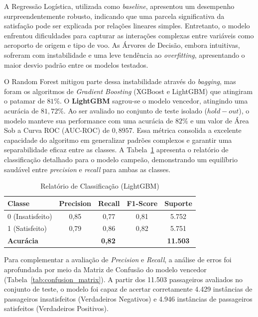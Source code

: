 \documentclass[12pt]{article}
\begin{document}
A Regressão Logística, utilizada como \textit{baseline}, apresentou um desempenho surpreendentemente robusto, indicando que uma parcela significativa da satisfação pode ser explicada por relações lineares simples. Entretanto, o modelo enfrentou dificuldades para capturar as interações complexas entre variáveis como aeroporto de origem e tipo de voo. As Árvores de Decisão, embora intuitivas, sofreram com instabilidade e uma leve tendência ao \textit{overfitting}, apresentando o maior desvio padrão entre os modelos testados.

O Random Forest mitigou parte dessa instabilidade através do \textit{bagging}, mas foram os algoritmos de \textit{Gradient Boosting} (XGBoost e LightGBM) que atingiram o patamar de $81\%$. O \textbf{LightGBM} sagrou-se o modelo vencedor, atingindo uma acurácia de $81,72\%$. Ao ser avaliado no conjunto de teste isolado ($hold-out$), o modelo manteve sua performance com uma acurácia de $82\%$ e um valor de Área Sob a Curva ROC (AUC-ROC) de $0,8957$. Essa métrica consolida a excelente capacidade do algoritmo em generalizar padrões complexos e garantir uma separabilidade eficaz entre as classes. A Tabela~\ref{tab:classification_report} apresenta o relatório de classificação detalhado para o modelo campeão, demonstrando um equilíbrio saudável entre \textit{precision} e \textit{recall} para ambas as classes.

\begin{table}[ht]
\centering
\caption{Relatório de Classificação (LightGBM)}
\label{tab:classification_report}
\begin{tabular}{|l|c|c|c|c|}
\hline
\textbf{Classe} & \textbf{Precision} & \textbf{Recall} & \textbf{F1-Score} & \textbf{Suporte} \\
\hline
0 (Insatisfeito) & 0,85 & 0,77 & 0,81 & 5.752 \\
1 (Satisfeito) & 0,79 & 0,86 & 0,82 & 5.751 \\
\hline
\textbf{Acurácia} & \multicolumn{3}{c|}{\textbf{0,82}} & \textbf{11.503} \\
\hline
\end{tabular}
\end{table}

Para complementar a avaliação de \textit{Precision} e \textit{Recall}, a análise de erros foi aprofundada por meio da Matriz de Confusão do modelo vencedor (Tabela~\ref{tab:confusion_matrix}). A partir dos 11.503 passageiros avaliados no conjunto de teste, o modelo foi capaz de acertar corretamente 4.429 instâncias de passageiros insatisfeitos (Verdadeiros Negativos) e 4.946 instâncias de passageiros satisfeitos (Verdadeiros Positivos). 
\end{document}

